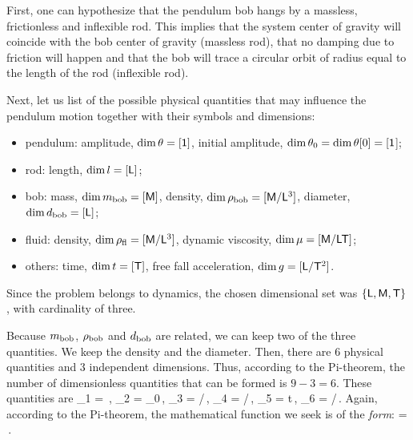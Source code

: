 First, one can hypothesize that the pendulum bob hangs by a massless, frictionless and inflexible rod. This implies that the system center of gravity will coincide with the bob center of gravity (massless rod), that no damping due to friction will happen and that the bob will trace a circular orbit of radius equal to the length of the rod (inflexible rod).

Next, let us list of the possible physical quantities that may influence the pendulum motion together with their symbols and dimensions:
\begin{itemize}
%
\item pendulum: amplitude, $\dim\theta = [\mathsf{1}]$, initial amplitude, $\dim\theta_0 = \dim\theta\!\left[{0}\right] = [\mathsf{1}$];
%
\item rod: length, $\dim l = [\mathsf{L}]$;
%
\item bob: mass, $\dim m_\text{bob} = [\mathsf{M}]$, density, $\dim\rho_\text{bob} = [\mathsf{M}/\mathsf{L}^3]$, diameter, $\dim d_\text{bob} = [\mathsf{L}]$;
%
\item fluid: density, $\dim\rho_\text{fl} = [\mathsf{M}/\mathsf{L}^3]$, dynamic viscosity, $\dim\mu = [\mathsf{M}/\mathsf{L}\mathsf{T}]$;
%
\item others: time, $\dim t = [\mathsf{T}]$, free fall acceleration, $\dim g = [\mathsf{L}/\mathsf{T}^2]$.
%
\end{itemize}
Since the problem belongs to dynamics, the chosen dimensional set was $\left\lbrace{\mathsf{L}, \mathsf{M}, \mathsf{T}}\right\rbrace$, with cardinality of three.

Because $m_\text{bob}$, $\rho_\text{bob}$ and $d_\text{bob}$ are related, we can keep two of the three quantities. We keep the density and the diameter. Then, there are 6 physical quantities and 3 independent dimensions. Thus, according to the Pi-theorem, the number of dimensionless quantities that can be formed is $9 - 3 = 6$. These quantities are
\beq
\kdim_1 = \theta\,,\quad
\kdim_2 = \theta_0\,,\quad
\kdim_3 = \diam/\length\,,\quad
\kdim_4 = \dens{}/\dens{}\,,\quad
\kdim_5 = t\sqrt{\grav/\length}\,,\quad
\kdim_6 = \dens{}\diam\sqrt{\length\grav}/\dynvis\,.
\eeq
Again, according to the Pi-theorem, the mathematical function we seek is of the \emph{form}:
\beq
\theta = \kdimf{}\,.
\eeq

